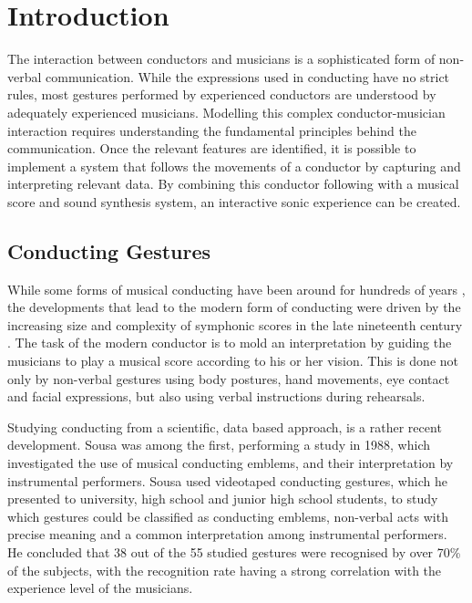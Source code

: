 \chapter{Introduction}
\label{chapter:intro}

The interaction between conductors and musicians
is a sophisticated form of non-verbal communication.
While the expressions used in conducting have no strict rules,
most gestures performed by experienced conductors are understood by
adequately experienced musicians.
Modelling this complex conductor-musician interaction
requires understanding the fundamental principles behind the communication.
Once the relevant features are identified,
it is possible to implement a system that
follows the movements of a conductor
by capturing and interpreting relevant data.
By combining this conductor following with
a musical score and sound synthesis system,
an interactive sonic experience can be created.

\section{Conducting Gestures}

While some forms of musical conducting have been around for hundreds of years
\cite{modernconductor},
the developments that lead to the modern form of conducting
were driven by the increasing size and complexity of symphonic scores
in the late nineteenth century \cite{gallops2005}.
The task of the modern conductor is to mold an interpretation
by guiding the musicians to play a musical score according to his or her vision.
This is done not only by non-verbal gestures
using body postures, hand movements, eye contact and facial expressions,
but also using verbal instructions during rehearsals.

Studying conducting from a scientific, data based approach,
is a rather recent development.
Sousa \cite{sousa1988} was among the first,
performing a study in 1988,
which investigated the use of musical conducting emblems,
and their interpretation by instrumental performers.
Sousa used videotaped conducting gestures,
which he presented to university, high school and junior high school students,
to study which gestures could be classified as conducting emblems,
non-verbal acts with precise meaning and
a common interpretation among instrumental performers.
He concluded that 38 out of the 55 studied gestures
were recognised by over 70\% of the subjects,
with the recognition rate having a strong correlation
with the experience level of the musicians.

